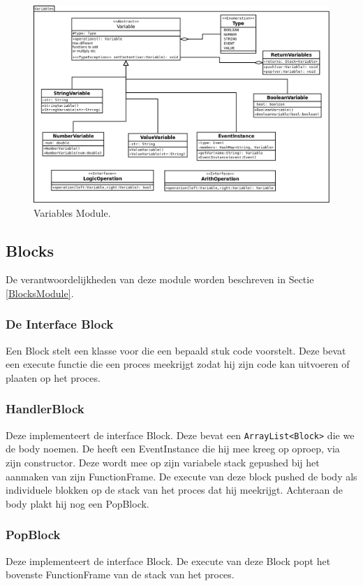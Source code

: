 \documentclass[]{article}
\begin{document}
\clearpage
 \begin{figure}
  \centering
   
\includegraphics[scale=0.8]{./AnalyseClassenDiagram/variables.png}
  \caption{Variables Module.}
\end{figure}
\clearpage

\subsection{Blocks}
De verantwoordelijkheden van deze module worden beschreven in Sectie \ref{BlocksModule}.
\subsubsection{De Interface Block}
Een Block stelt een klasse voor die een bepaald stuk code voorstelt. Deze bevat een execute functie die een proces meekrijgt zodat hij zijn code kan uitvoeren of plaaten op het proces.
\subsubsection{HandlerBlock}
Deze implementeert de interface Block. Deze bevat een \texttt{ArrayList<Block>} \cite{arraylist} die we de body noemen. De heeft een EventInstance die hij mee kreeg op oproep, via zijn constructor. Deze wordt mee op zijn variabele stack gepushed bij het aanmaken van zijn FunctionFrame. De execute van deze block pushed de body als individuele blokken op de stack van het proces dat hij meekrijgt. Achteraan de body plakt hij nog een PopBlock.
\subsubsection{PopBlock}
Deze implementeert de interface Block. De execute van deze Block popt het bovenste FunctionFrame van de stack van het proces.
\end{document}
